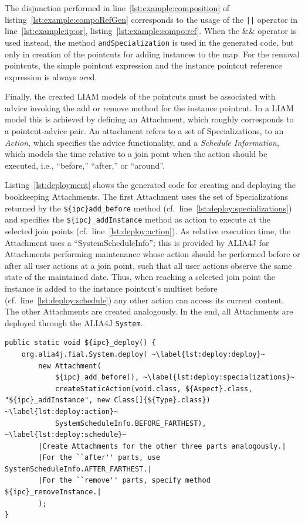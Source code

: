 \documentclass{acm_proc_article-sp}
\newcommand{\lstinln}[1]{\lstinline~#1~}
\begin{document}
The disjunction performed in line~\ref{lst:example:composition} of listing~\ref{lst:example:compoRefGen} corresponds to the usage of the \lstinln{||} operator in line~\ref{lst:example:ip:or}, listing~\ref{lst:example:compo:ref}.
When the \&\& operator is used instead, the method \lstinln{andSpecialization} is used in the generated code, but only in creation of the pointcuts for adding instances to the map. For the removal pointcuts, the simple pointcut expression and the instance pointcut reference expression is always \emph{or}ed.

Finally, the created LIAM models of the pointcuts must be associated with advice invoking the add or remove method for the instance pointcut.
In a LIAM model this is achieved by defining an Attachment, which roughly corresponds to a pointcut-advice pair.
An attachment refers to a set of Specializations, to an \emph{Action}, which specifies the advice functionality, and a \emph{Schedule Information}, which models the time relative to a join point when the action should be executed, i.e., ``before,'' ``after,'' or ``around''.

Listing~\ref{lst:deployment} shows the generated code for creating and deploying the bookkeeping Attachments.
The first Attachment uses the set of Specializations returned by the \lstinline!${ipc}add_before! method (cf.\ line~\ref{lst:deploy:specializations}) and specifies the \lstinline!${ipc}_addInstance! method as action to execute at the selected join points (cf.\ line~\ref{lst:deploy:action}).
As relative execution time, the Attachment uses a ``SystemScheduleInfo''; this is provided by ALIA4J for Attachments performing maintenance whose action should be performed before or after all user actions at a join point, such that all user actions observe the same state of the maintained date.
Thus, when reaching a selected join point the instance is added to the instance pointcut's multiset before (cf.\ line~\ref{lst:deploy:schedule}) any other action can access its current content.
The other Attachments are created analogously.
In the end, all Attachments are deployed through the ALIA4J \lstinln{System}.

\begin{lstlisting}[float,caption={Deployment of the bookkeeping for an instance pointcut.},label=lst:deployment]
public static void ${ipc}_deploy() {
	org.alia4j.fial.System.deploy( ~\label{lst:deploy:deploy}~
		new Attachment(
			${ipc}_add_before(), ~\label{lst:deploy:specializations}~
			createStaticAction(void.class, ${Aspect}.class, "${ipc}_addInstance", new Class[]{${Type}.class}) ~\label{lst:deploy:action}~
			SystemScheduleInfo.BEFORE_FARTHEST), ~\label{lst:deploy:schedule}~
		|Create Attachments for the other three parts analogously.|
		|For the ``after'' parts, use SystemScheduleInfo.AFTER_FARTHEST.|
		|For the ``remove'' parts, specify method ${ipc}_removeInstance.|
		);
}
\end{lstlisting}
\end{document}
